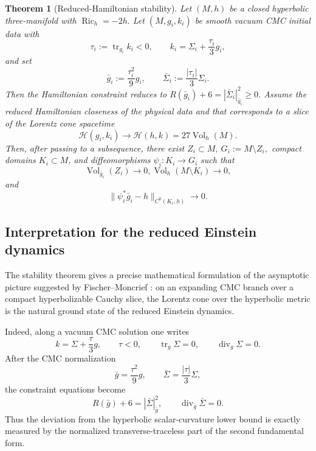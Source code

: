 \documentclass{amsart}
\newtheorem{theorem}{Theorem}[section]
\begin{document}
\begin{theorem}[Reduced-Hamiltonian stability]
\label{main2}
Let \((M,h)\) be a closed hyperbolic three-manifold with
$ \operatorname{Ric}_h=-2h .$
Let \((M,g_i,k_i)\) be smooth vacuum CMC initial data with
\[
        \tau_i:=\operatorname{tr}_{g_i}k_i<0,
        \qquad
        k_i=\Sigma_i+\frac{\tau_i}{3}g_i,
\]
and set
\[
        \bar g_i:=\frac{\tau_i^2}{9}g_i,
        \qquad
        \bar\Sigma_i:=\frac{|\tau_i|}{3}\Sigma_i .
\]
Then the Hamiltonian constraint reduces to
$ R(\bar g_i)+6=|\bar\Sigma_i|_{\bar g_i}^{2}\geq 0$.
Assume the reduced Hamiltonian closeness of the physical data and that corresponds to a slice of the Lorentz cone spacetime
\[
        \mathcal H(g_i,k_i)\longrightarrow \mathcal{H}(h,k)=27\operatorname{Vol}_h(M).
\]
Then, after passing to a subsequence, there exist
$ Z_i\subset M,~ G_i:=M\setminus Z_i,$
compact domains \(K_i\subset M\), and diffeomorphisms
$\psi_i:K_i\longrightarrow G_i$
such that
\[
        \operatorname{Vol}_{\bar g_i}(Z_i)\to0,
        \operatorname{Vol}_h(M\setminus K_i)\to0,
\]
and
\[
        \|\psi_i^*\bar g_i-h\|_{C^0(K_i,h)}\to0.
\]
\end{theorem}

\noindent \subsection{Interpretation for the reduced Einstein dynamics}

The stability theorem gives a precise mathematical formulation of the
asymptotic picture suggested by Fischer--Moncrief
\cite{fischer2000reduced,fischer2001reduced}: on an expanding
CMC branch over a compact hyperbolizable Cauchy slice, the Lorentz cone over
the hyperbolic metric is the natural ground state of the reduced Einstein
dynamics.

\noindent Indeed, along a vacuum CMC solution one writes
\[
        k=\Sigma+\frac{\tau}{3}g,
        \qquad
        \tau<0,
        \qquad
        \operatorname{tr}_g\Sigma=0,
        \qquad
        \operatorname{div}_g\Sigma=0 .
\]
After the CMC normalization
\[
        \bar g=\frac{\tau^2}{9}g,
        \qquad
        \bar\Sigma=\frac{|\tau|}{3}\Sigma ,
\]
the constraint equations become
\[
        R(\bar g)+6=|\bar\Sigma|_{\bar g}^2,
        \qquad
        \operatorname{div}_{\bar g}\bar\Sigma=0 .
\]
Thus the deviation from the hyperbolic scalar-curvature lower bound is
exactly measured by the normalized transverse-traceless part of the second
fundamental form.
\end{document}
